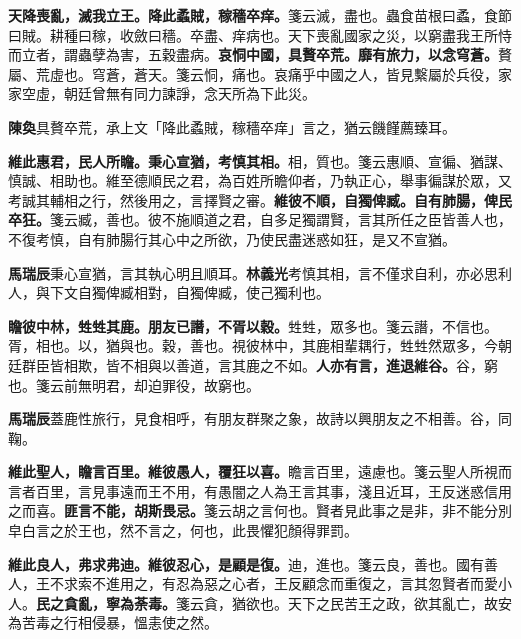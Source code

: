 \textbf{天降喪亂，滅我立王。降此蟊賊，稼穡卒痒。}{\footnotesize 箋云滅，盡也。蟲食苗根曰蟊，食節曰賊。耕種曰稼，收斂曰穡。卒盡、痒病也。天下喪亂國家之災，以窮盡我王所恃而立者，謂蟲孽為害，五穀盡病。}\textbf{哀恫中國，具贅卒荒。靡有旅力，以念穹蒼。}{\footnotesize 贅屬、荒虛也。穹蒼，蒼天。箋云恫，痛也。哀痛乎中國之人，皆見繫屬於兵役，家家空虛，朝廷曾無有同力諫諍，念天所為下此災。}

\begin{quoting}\textbf{陳奐}具贅卒荒，承上文「降此蟊賊，稼穡卒痒」言之，猶云饑饉薦臻耳。\end{quoting}

\textbf{維此惠君，民人所瞻。秉心宣猶，考慎其相。}{\footnotesize 相，質也。箋云惠順、宣徧、猶謀、慎誠、相助也。維至德順民之君，為百姓所瞻仰者，乃執正心，舉事徧謀於眾，又考誠其輔相之行，然後用之，言擇賢之審。}\textbf{維彼不順，自獨俾臧。自有肺腸，俾民卒狂。}{\footnotesize 箋云臧，善也。彼不施順道之君，自多足獨謂賢，言其所任之臣皆善人也，不復考慎，自有肺腸行其心中之所欲，乃使民盡迷惑如狂，是又不宣猶。}

\begin{quoting}\textbf{馬瑞辰}秉心宣猶，言其執心明且順耳。\textbf{林義光}考慎其相，言不僅求自利，亦必思利人，與下文自獨俾臧相對，自獨俾臧，使己獨利也。\end{quoting}

\textbf{瞻彼中林，甡甡其鹿。朋友已譖，不胥以穀。}{\footnotesize 甡甡，眾多也。箋云譖，不信也。胥，相也。以，猶與也。穀，善也。視彼林中，其鹿相輩耦行，甡甡然眾多，今朝廷群臣皆相欺，皆不相與以善道，言其鹿之不如。}\textbf{人亦有言，進退維谷。}{\footnotesize 谷，窮也。箋云前無明君，却迫罪役，故窮也。}

\begin{quoting}\textbf{馬瑞辰}蓋鹿性旅行，見食相呼，有朋友群聚之象，故詩以興朋友之不相善。谷，同鞠。\end{quoting}

\textbf{維此聖人，瞻言百里。維彼愚人，覆狂以喜。}{\footnotesize 瞻言百里，遠慮也。箋云聖人所視而言者百里，言見事遠而王不用，有愚闇之人為王言其事，淺且近耳，王反迷惑信用之而喜。}\textbf{匪言不能，胡斯畏忌。}{\footnotesize 箋云胡之言何也。賢者見此事之是非，非不能分別皁白言之於王也，然不言之，何也，此畏懼犯顏得罪罰。}

\textbf{維此良人，弗求弗迪。維彼忍心，是顧是復。}{\footnotesize 迪，進也。箋云良，善也。國有善人，王不求索不進用之，有忍為惡之心者，王反顧念而重復之，言其忽賢者而愛小人。}\textbf{民之貪亂，寧為荼毒。}{\footnotesize 箋云貪，猶欲也。天下之民苦王之政，欲其亂亡，故安為苦毒之行相侵暴，慍恚使之然。}

